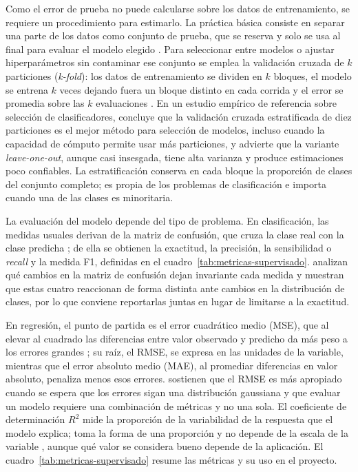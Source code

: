 Como el error de prueba no puede calcularse sobre los datos de entrenamiento, se requiere un procedimiento para estimarlo. La práctica básica consiste en separar una parte de los datos como conjunto de prueba, que se reserva y solo se usa al final para evaluar el modelo elegido \parencite{Geron2022}. Para seleccionar entre modelos o ajustar hiperparámetros sin contaminar ese conjunto se emplea la validación cruzada de $k$ particiones (\textit{k-fold}): los datos de entrenamiento se dividen en $k$ bloques, el modelo se entrena $k$ veces dejando fuera un bloque distinto en cada corrida y el error se promedia sobre las $k$ evaluaciones \parencite{James2021}. En un estudio empírico de referencia sobre selección de clasificadores, \textcite{Kohavi1995} concluye que la validación cruzada estratificada de diez particiones es el mejor método para selección de modelos, incluso cuando la capacidad de cómputo permite usar más particiones, y advierte que la variante \textit{leave-one-out}, aunque casi insesgada, tiene alta varianza y produce estimaciones poco confiables. La estratificación conserva en cada bloque la proporción de clases del conjunto completo; es propia de los problemas de clasificación e importa cuando una de las clases es minoritaria.

La evaluación del modelo depende del tipo de problema. En clasificación, las medidas usuales derivan de la matriz de confusión, que cruza la clase real con la clase predicha \parencite{Sokolova2009, Geron2022}; de ella se obtienen la exactitud, la precisión, la sensibilidad o \textit{recall} y la medida F1, definidas en el cuadro~\ref{tab:metricas-supervisado}. \textcite{Sokolova2009} analizan qué cambios en la matriz de confusión dejan invariante cada medida y muestran que estas cuatro reaccionan de forma distinta ante cambios en la distribución de clases, por lo que conviene reportarlas juntas en lugar de limitarse a la exactitud.

En regresión, el punto de partida es el error cuadrático medio (MSE), que al elevar al cuadrado las diferencias entre valor observado y predicho da más peso a los errores grandes \parencite{James2021}; su raíz, el RMSE, se expresa en las unidades de la variable, mientras que el error absoluto medio (MAE), al promediar diferencias en valor absoluto, penaliza menos esos errores. \textcite{Chai2014} sostienen que el RMSE es más apropiado cuando se espera que los errores sigan una distribución gaussiana y que evaluar un modelo requiere una combinación de métricas y no una sola. El coeficiente de determinación $R^2$ mide la proporción de la variabilidad de la respuesta que el modelo explica; toma la forma de una proporción y no depende de la escala de la variable \parencite{James2021}, aunque qué valor se considera bueno depende de la aplicación. El cuadro~\ref{tab:metricas-supervisado} resume las métricas y su uso en el proyecto.

